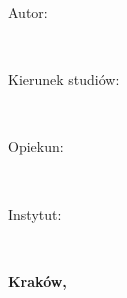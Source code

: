 {\begin{titlepage}
\begin{minipage}{0.5\textwidth}
\begin{flushleft}
                {\large Autor:}
            \end{flushleft}
        \end{minipage}
        \hfill
        \begin{minipage}{0.5\textwidth}
            \begin{flushright}
                {\large \bf \textsf{\@author}}\\
            \end{flushright}
        \end{minipage}
        \begin{minipage}{0.5\textwidth}
            \begin{flushleft}
                {\large Kierunek studiów:}
            \end{flushleft}
        \end{minipage}
        \hfill
        \begin{minipage}{0.5\textwidth}
            \begin{flushright}
                {\large \bf \textsf{\faculty}}\\
            \end{flushright}
        \end{minipage}
        \hfill
        \begin{minipage}{0.5\textwidth}
            \begin{flushleft}
                {\large Opiekun:}
            \end{flushleft}
        \end{minipage}
        \hfill
        \begin{minipage}{0.5\textwidth}
            \begin{flushright}
                {\large \bf \textsf{\supervisor}}\\
            \end{flushright}
        \end{minipage}
        \hfill
        \begin{minipage}{0.5\textwidth}
            \begin{flushleft}
                {\large Instytut:}
            \end{flushleft}
        \end{minipage}
        \hfill
        \begin{minipage}{0.5\textwidth}
            \begin{flushright}
                {\large \bf \textsf{\institute}}\\
            \end{flushright}
        \end{minipage}
        
        \vspace{15ex}
        
        \begin{center}
            {\large \bf \textsf{Kraków, \@date}}
        \end{center}
    \end{titlepage}%
}
\makeatother